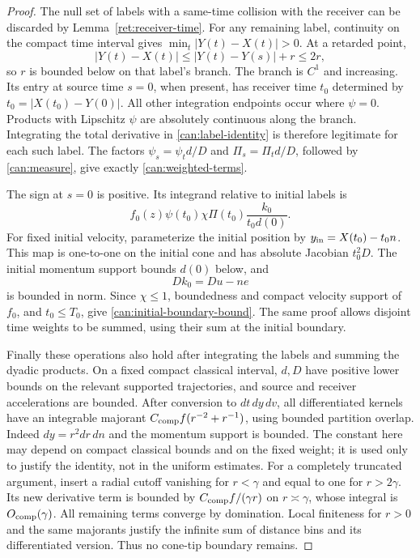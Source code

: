 \begin{proof}
The null set of labels with a same-time collision with the receiver can
be discarded by Lemma~\ref{ret:receiver-time}. For any remaining
label, continuity on the compact time interval gives
$\min_t|Y(t)-X(t)|>0$. At a retarded point,
\[
 |Y(t)-X(t)|\leq |Y(t)-Y(s)|+r\leq2r,
\]
so $r$ is bounded below on that label's branch. The branch is $C^1$ and
increasing. Its entry at source time $s=0$, when present, has receiver
time $t_0$ determined by $t_0=|X(t_0)-Y(0)|$. All other integration
endpoints occur where $\psi=0$. Products with Lipschitz $\psi$ are
absolutely continuous along the branch. Integrating the total derivative
in \eqref{can:label-identity} is therefore legitimate for each such label.
The factors $\psi_s=\psi_t d/D$ and $\Pi_s=\Pi_t d/D$, followed by
\eqref{can:measure}, give exactly \eqref{can:weighted-terms}.

The sign at $s=0$ is positive. Its integrand relative to initial labels is
\[
 f_0(z)\psi(t_0)\chi\Pi(t_0)\frac{k_0}{t_0d(0)}.
\]
For fixed initial velocity, parameterize the initial position by
$y_{\rm in}=X(t_0)-t_0n$. This map is one-to-one on the initial cone
and has absolute Jacobian $t_0^2D$. The initial momentum support bounds
$d(0)$ below, and
\[
 Dk_0=Du-ne
\]
is bounded in norm. Since $\chi\leq1$, boundedness and compact velocity
support of $f_0$, and $t_0\leq T_0$, give
\eqref{can:initial-boundary-bound}. The same proof allows disjoint time
weights to be summed, using their sum at the initial boundary.

Finally these operations also hold after integrating the labels and
summing the dyadic products. On a fixed compact classical interval,
$d,D$ have positive lower bounds on the relevant supported trajectories,
and source and receiver accelerations are bounded. After conversion to
$dt\,dy\,dv$, all differentiated kernels have an integrable majorant
$C_{\rm comp} f(r^{-2}+r^{-1})$, using bounded partition overlap.
Indeed $dy=r^2dr\,dn$ and the momentum support is bounded. The constant
here may depend on compact classical bounds and on the fixed weight;
it is used only to justify the identity, not in the uniform estimates.
For a completely truncated argument, insert a radial cutoff vanishing for
$r<\gamma$ and equal to one for $r>2\gamma$. Its new derivative term is
bounded by $C_{\rm comp}f/(\gamma r)$ on $r\asymp\gamma$, whose integral
is $O_{\rm comp}(\gamma)$. All remaining terms converge by domination.
Local finiteness for $r>0$ and the same majorants justify the infinite sum
of distance bins and its differentiated version. Thus no cone-tip
boundary remains.
\end{proof}

